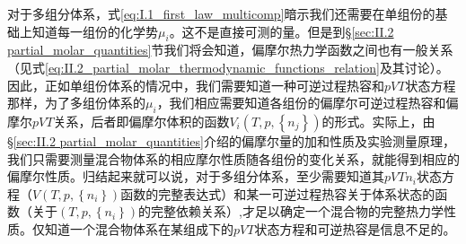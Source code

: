 \documentclass[main.tex]{subfiles}
\begin{document}
对于多组分体系，式\eqref{eq:I.1_first_law_multicomp}暗示我们还需要在单组份的基础上知道每一组份的化学势$\mu_i$。这不是直接可测的量。但是到\S\ref{sec:II.2 partial_molar_quantities}节我们将会知道，偏摩尔热力学函数之间也有一般关系（见式\eqref{eq:II.2_partial_molar_thermodynamic_functions_relation}及其讨论）。因此，正如单组份体系的情况中，我们需要知道一种可逆过程热容和$pVT$状态方程那样，为了多组份体系的$\mu_i$，我们相应需要知道各组份的偏摩尔可逆过程热容和偏摩尔$pVT$关系，后者即偏摩尔体积的函数$V_i\left(T,p,\left\{n_j\right\}\right)$的形式。实际上，由\S\ref{sec:II.2 partial_molar_quantities}介绍的偏摩尔量的加和性质及实验测量原理，我们只需要测量混合物体系的相应摩尔性质随各组份的变化关系，就能得到相应的偏摩尔性质。归结起来就可以说，对于多组分体系，至少需要知道其$pVTn_i$状态方程（$V\left(T,p,\left\{n_i\right\}\right)$函数的完整表达式）和某一可逆过程热容关于体系状态的函数（关于$\left(T,p,\left\{n_i\right\}\right)$的完整依赖关系）,才足以确定一个混合物的完整热力学性质。仅知道一个混合物体系在某组成下的$pVT$状态方程和可逆热容是信息不足的。
\end{document}
